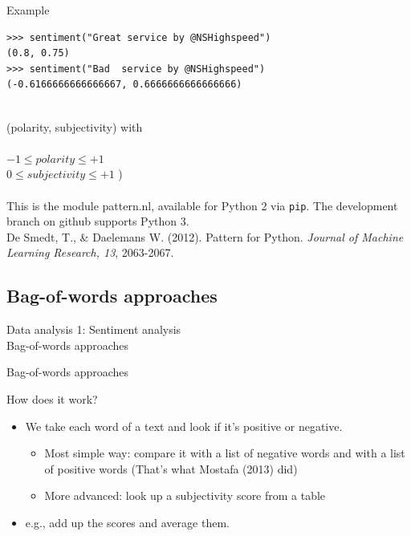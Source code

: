 \documentclass{beamer}
\begin{document}
\begin{frame}[fragile]{Example}
\begin{lstlisting}
>>> sentiment("Great service by @NSHighspeed")
(0.8, 0.75)
>>> sentiment("Bad  service by @NSHighspeed")
(-0.6166666666666667, 0.6666666666666666)
\end{lstlisting}
~\\
\footnotesize{(polarity, subjectivity) with \\ ~ \\
 $-1 \leq polarity \leq +1$\\
 $0 \leq subjectivity \leq +1$ )} \\~\\
\vskip 1cm 
\tiny{This is the module pattern.nl, available for Python 2 via \texttt{pip}. The development branch on github supports Python 3. \\ De Smedt, T., \& Daelemans W. (2012).  Pattern for Python. \emph{Journal of Machine Learning Research, 13}, 2063-2067.\\}
\end{frame}

\subsection{Bag-of-words approaches}
\begin{frame}
Data analysis 1: Sentiment analysis\\
Bag-of-words approaches
\end{frame}


\begin{frame}{Bag-of-words approaches}
\begin{block}{How does it work?}
\begin{itemize}
\item We take each word of a text and look if it's positive or negative.
\begin{itemize}
\item<2-> Most simple way: compare it with a list of negative words and with a list of positive words {\small(That's what Mostafa (2013) did)}
\item<3-> More advanced: look up a subjectivity score from a table 
\end{itemize}
\item<4-> e.g., add up the scores and average them.
\end{itemize}
\end{block}
\end{frame}
\end{document}

